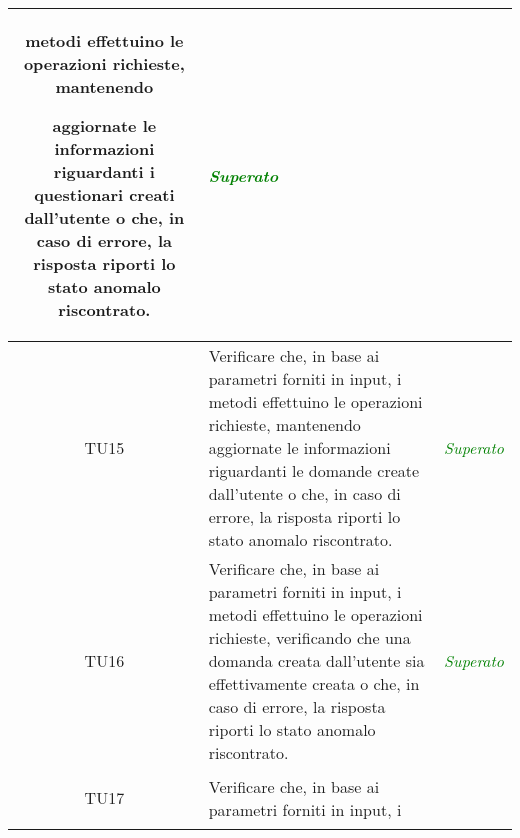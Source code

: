 \begin{longtable}{|c|>{}m{10cm}|c|}
metodi effettuino le operazioni richieste, mantenendo

aggiornate le informazioni riguardanti i questionari creati dall'utente
 o che, in caso di errore,
la risposta riporti lo stato anomalo riscontrato. & \textcolor{Green}{\textit{Superato}}\\ \hline
\hypertarget{TU15}{TU15} & Verificare che, in base ai parametri forniti in input, i
metodi effettuino le operazioni richieste, mantenendo
aggiornate le informazioni riguardanti le domande create dall’utente o che, in caso di errore,
la risposta riporti lo stato anomalo riscontrato. & \textcolor{Green}{\textit{Superato}}\\ \hline
\hypertarget{TU16}{TU16} & Verificare che, in base ai parametri forniti in input, i
metodi effettuino le operazioni richieste, verificando che una domanda creata dall’utente sia effettivamente creata o che, in caso di errore, la risposta riporti lo stato anomalo riscontrato. & \textcolor{Green}{\textit{Superato}}\\ \hline
\hypertarget{TU17}{TU17} & Verificare che, in base ai parametri forniti in input, i


\end{longtable}
